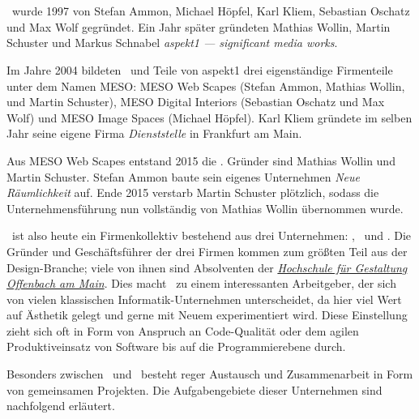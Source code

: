 \section{\meso}
\label{sec:e_meso}

\meso~wurde 1997 von Stefan Ammon, Michael Höpfel, Karl Kliem, Sebastian
Oschatz und Max Wolf gegründet. Ein Jahr später gründeten Mathias Wollin,
Martin Schuster und Markus Schnabel \emph{aspekt1 --- significant media works}.

Im Jahre 2004 bildeten \meso~und Teile von aspekt1 drei eigenständige
Firmenteile unter dem Namen MESO: MESO Web Scapes (Stefan Ammon, Mathias
Wollin, und Martin Schuster), MESO Digital Interiors (Sebastian Oschatz und Max
Wolf) und MESO Image Spaces (Michael Höpfel). Karl Kliem gründete im selben
Jahr seine eigene Firma \emph{Dienststelle} in Frankfurt am Main.

Aus MESO Web Scapes entstand 2015 die \mesods. Gründer sind  Mathias Wollin und
Martin Schuster.  Stefan Ammon baute sein eigenes Unternehmen \emph{Neue
Räumlichkeit} auf.  Ende 2015 verstarb Martin Schuster plötzlich, sodass die
Unternehmensführung nun vollständig von Mathias Wollin übernommen wurde.

\meso~ist also heute ein Firmenkollektiv bestehend aus drei Unternehmen:
\mesodi, \mesods~und \mesois.  Die Gründer und Geschäftsführer der drei Firmen
kommen zum größten Teil aus der Design-Branche; viele von ihnen sind Absolventen
der \emph{\href{http://hfg-offenbach.de}{Hochschule für Gestaltung Offenbach am
Main}}.  Dies macht \meso~zu einem interessanten Arbeitgeber, der sich von
vielen klassischen Informatik-Unternehmen unterscheidet, da hier viel Wert auf
Ästhetik gelegt und gerne mit Neuem experimentiert wird.  Diese Einstellung
zieht sich oft in Form von Anspruch an Code-Qualität oder dem agilen
Produktiveinsatz von Software bis auf die Programmierebene durch.

Besonders zwischen \mesodi~und \mesods~besteht reger Austausch und
Zusammenarbeit in Form von gemeinsamen Projekten.  Die Aufgabengebiete dieser
Unternehmen sind nachfolgend erläutert.



